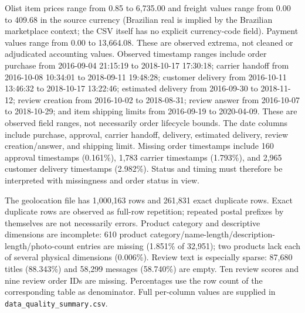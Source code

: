 \documentclass[11pt,a4paper]{article}
\begin{document}
Olist item prices range from 0.85 to 6,735.00 and freight values range from 0.00 to 409.68 in the source currency (Brazilian real is implied by the Brazilian marketplace context; the CSV itself has no explicit currency-code field). Payment values range from 0.00 to 13,664.08. These are observed extrema, not cleaned or adjudicated accounting values. Observed timestamp ranges include order purchase from 2016-09-04 21:15:19 to 2018-10-17 17:30:18; carrier handoff from 2016-10-08 10:34:01 to 2018-09-11 19:48:28; customer delivery from 2016-10-11 13:46:32 to 2018-10-17 13:22:46; estimated delivery from 2016-09-30 to 2018-11-12; review creation from 2016-10-02 to 2018-08-31; review answer from 2016-10-07 to 2018-10-29; and item shipping limits from 2016-09-19 to 2020-04-09. These are observed field ranges, not necessarily order lifecycle bounds. The date columns include purchase, approval, carrier handoff, delivery, estimated delivery, review creation/answer, and shipping limit. Missing order timestamps include 160 approval timestamps (0.161\%), 1,783 carrier timestamps (1.793\%), and 2,965 customer delivery timestamps (2.982\%). Status and timing must therefore be interpreted with missingness and order status in view.

The geolocation file has 1,000,163 rows and 261,831 exact duplicate rows. Exact duplicate rows are observed as full-row repetition; repeated postal prefixes by themselves are not necessarily errors. Product category and descriptive dimensions are incomplete: 610 product category/name-length/description-length/photo-count entries are missing (1.851\% of 32,951); two products lack each of several physical dimensions (0.006\%). Review text is especially sparse: 87,680 titles (88.343\%) and 58,299 messages (58.740\%) are empty. Ten review scores and nine review order IDs are missing. Percentages use the row count of the corresponding table as denominator. Full per-column values are supplied in \texttt{data\_quality\_summary.csv}.
\end{document}
